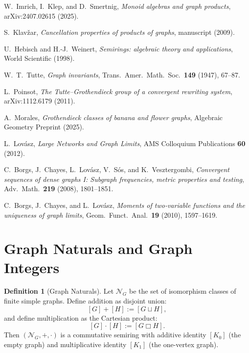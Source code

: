 \documentclass[11pt]{article}
\theoremstyle{definition}
\newtheorem{definition}{Definition}[section]
\theoremstyle{plain}
\theoremstyle{remark}
\begin{document}
\begin{thebibliography}{9}
W.~Imrich, I.~Klep, and D.~Smertnig, \emph{Monoid algebras and graph products}, arXiv:2407.02615 (2025).

S.~Klavžar, \emph{Cancellation properties of products of graphs}, manuscript (2009).

U.~Hebisch and H.-J.~Weinert, \emph{Semirings: algebraic theory and applications}, World Scientific (1998).

W.~T.~Tutte, \emph{Graph invariants}, Trans.\ Amer.\ Math.\ Soc.\ \textbf{149} (1947), 67–87.

L.~Poinsot, \emph{The Tutte–Grothendieck group of a convergent rewriting system}, arXiv:1112.6179 (2011).

A.~Morales, \emph{Grothendieck classes of banana and flower graphs}, Algebraic Geometry Preprint (2025).

L.~Lovász, \emph{Large Networks and Graph Limits}, AMS Colloquium Publications \textbf{60} (2012).

C.~Borgs, J.~Chayes, L.~Lovász, V.~Sós, and K.~Vesztergombi, \emph{Convergent sequences of dense graphs I: Subgraph frequencies, metric properties and testing}, Adv.\ Math.\ \textbf{219} (2008), 1801–1851.

C.~Borgs, J.~Chayes, and L.~Lovász, \emph{Moments of two‑variable functions and the uniqueness of graph limits}, Geom.\ Funct.\ Anal.\ \textbf{19} (2010), 1597–1619.
\end{thebibliography}

\section{Graph Naturals and Graph Integers}

\begin{definition}[Graph Naturals]
Let \(\mathcal{N}_G\) be the set of isomorphism classes of finite simple graphs. Define addition as disjoint union:
\[
[G] + [H] := [G \sqcup H],
\]
and define multiplication as the Cartesian product:
\[
[G] \cdot [H] := [G \Box H].
\]
Then \((\mathcal{N}_G, +, \cdot)\) is a commutative semiring with additive identity \([K_0]\) (the empty graph) and multiplicative identity \([K_1]\) (the one-vertex graph).
\end{definition}
\end{document}
